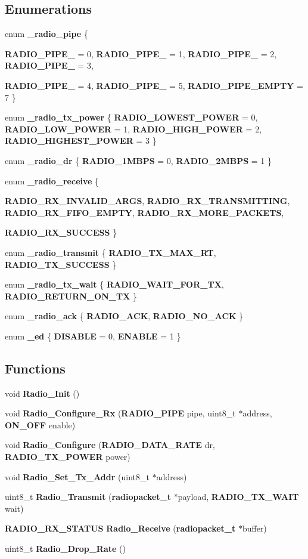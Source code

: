 \subsection*{Enumerations}
\begin{CompactItemize}
\item 
enum {\bf \_\-radio\_\-pipe} \{ \par
{\bf RADIO\_\-PIPE\_} =  0, 
{\bf RADIO\_\-PIPE\_} =  1, 
{\bf RADIO\_\-PIPE\_} =  2, 
{\bf RADIO\_\-PIPE\_} =  3, 
\par
{\bf RADIO\_\-PIPE\_} =  4, 
{\bf RADIO\_\-PIPE\_} =  5, 
{\bf RADIO\_\-PIPE\_\-EMPTY} =  7
 \}
\item 
enum {\bf \_\-radio\_\-tx\_\-power} \{ {\bf RADIO\_\-LOWEST\_\-POWER} =  0, 
{\bf RADIO\_\-LOW\_\-POWER} =  1, 
{\bf RADIO\_\-HIGH\_\-POWER} =  2, 
{\bf RADIO\_\-HIGHEST\_\-POWER} =  3
 \}
\item 
enum {\bf \_\-radio\_\-dr} \{ {\bf RADIO\_\-1MBPS} =  0, 
{\bf RADIO\_\-2MBPS} =  1
 \}
\item 
enum {\bf \_\-radio\_\-receive} \{ \par
{\bf RADIO\_\-RX\_\-INVALID\_\-ARGS}, 
{\bf RADIO\_\-RX\_\-TRANSMITTING}, 
{\bf RADIO\_\-RX\_\-FIFO\_\-EMPTY}, 
{\bf RADIO\_\-RX\_\-MORE\_\-PACKETS}, 
\par
{\bf RADIO\_\-RX\_\-SUCCESS}
 \}
\item 
enum {\bf \_\-radio\_\-transmit} \{ {\bf RADIO\_\-TX\_\-MAX\_\-RT}, 
{\bf RADIO\_\-TX\_\-SUCCESS}
 \}
\item 
enum {\bf \_\-radio\_\-tx\_\-wait} \{ {\bf RADIO\_\-WAIT\_\-FOR\_\-TX}, 
{\bf RADIO\_\-RETURN\_\-ON\_\-TX}
 \}
\item 
enum {\bf \_\-radio\_\-ack} \{ {\bf RADIO\_\-ACK}, 
{\bf RADIO\_\-NO\_\-ACK}
 \}
\item 
enum {\bf \_\-ed} \{ {\bf DISABLE} = 0, 
{\bf ENABLE} = 1
 \}
\end{CompactItemize}
\subsection*{Functions}
\begin{CompactItemize}
\item 
void {\bf Radio\_\-Init} ()
\item 
void {\bf Radio\_\-Configure\_\-Rx} ({\bf RADIO\_\-PIPE} pipe, uint8\_\-t $\ast$address, {\bf ON\_\-OFF} enable)
\item 
void {\bf Radio\_\-Configure} ({\bf RADIO\_\-DATA\_\-RATE} dr, {\bf RADIO\_\-TX\_\-POWER} power)
\item 
void {\bf Radio\_\-Set\_\-Tx\_\-Addr} (uint8\_\-t $\ast$address)
\item 
uint8\_\-t {\bf Radio\_\-Transmit} ({\bf radiopacket\_\-t} $\ast$payload, {\bf RADIO\_\-TX\_\-WAIT} wait)
\item 
{\bf RADIO\_\-RX\_\-STATUS} {\bf Radio\_\-Receive} ({\bf radiopacket\_\-t} $\ast$buffer)
\item 
uint8\_\-t {\bf Radio\_\-Drop\_\-Rate} ()
\end{CompactItemize}


